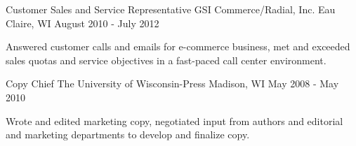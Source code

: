 \begin{cventries}
    \cventry
    {Customer Sales and Service Representative} %
    {GSI Commerce/Radial, Inc.} %
    {Eau Claire, WI} %
    {August 2010 - July 2012} %
    {
      \begin{cvitems} %
        \item {Answered customer calls and emails for e-commerce business, met and exceeded sales quotas and service objectives in a fast-paced call center environment.}
      \end{cvitems}
    }   
     
    \cventry
    {Copy Chief}
    {The University of Wisconsin-Press}
    {Madison, WI}
    {May 2008 - May 2010}
    {\begin{cvitems}
      \item{Wrote and edited marketing copy, negotiated input from authors and editorial and marketing departments to develop and finalize copy.}
    \end{cvitems}
    }


\end{cventries}

